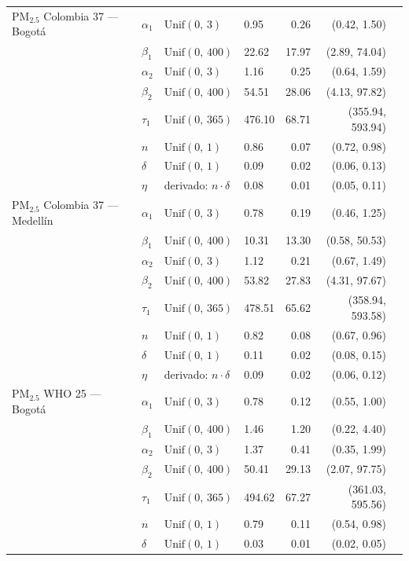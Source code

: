 \begin{longtable}{llllrrr}
PM$_{2.5}$ Colombia 37 --- Bogot\'{a} & $\alpha_{1}$ & $\text{Unif}(0,\,3)$ & 0.95 & 0.26 & (0.42, 1.50) \\
 & $\beta_{1}$ & $\text{Unif}(0,\,400)$ & 22.62 & 17.97 & (2.89, 74.04) \\
 & $\alpha_{2}$ & $\text{Unif}(0,\,3)$ & 1.16 & 0.25 & (0.64, 1.59) \\
 & $\beta_{2}$ & $\text{Unif}(0,\,400)$ & 54.51 & 28.06 & (4.13, 97.82) \\
 & $\tau_{1}$ & $\text{Unif}(0,\,365)$ & 476.10 & 68.71 & (355.94, 593.94) \\
 & $n$ & $\text{Unif}(0,\,1)$ & 0.86 & 0.07 & (0.72, 0.98) \\
 & $\delta$ & $\text{Unif}(0,\,1)$ & 0.09 & 0.02 & (0.06, 0.13) \\
 & $\eta$ & derivado: $n \cdot \delta$ & 0.08 & 0.01 & (0.05, 0.11) \\
\midrule
PM$_{2.5}$ Colombia 37 --- Medell\'{i}n & $\alpha_{1}$ & $\text{Unif}(0,\,3)$ & 0.78 & 0.19 & (0.46, 1.25) \\
 & $\beta_{1}$ & $\text{Unif}(0,\,400)$ & 10.31 & 13.30 & (0.58, 50.53) \\
 & $\alpha_{2}$ & $\text{Unif}(0,\,3)$ & 1.12 & 0.21 & (0.67, 1.49) \\
 & $\beta_{2}$ & $\text{Unif}(0,\,400)$ & 53.82 & 27.83 & (4.31, 97.67) \\
 & $\tau_{1}$ & $\text{Unif}(0,\,365)$ & 478.51 & 65.62 & (358.94, 593.58) \\
 & $n$ & $\text{Unif}(0,\,1)$ & 0.82 & 0.08 & (0.67, 0.96) \\
 & $\delta$ & $\text{Unif}(0,\,1)$ & 0.11 & 0.02 & (0.08, 0.15) \\
 & $\eta$ & derivado: $n \cdot \delta$ & 0.09 & 0.02 & (0.06, 0.12) \\
\midrule
PM$_{2.5}$ WHO 25 --- Bogot\'{a} & $\alpha_{1}$ & $\text{Unif}(0,\,3)$ & 0.78 & 0.12 & (0.55, 1.00) \\
 & $\beta_{1}$ & $\text{Unif}(0,\,400)$ & 1.46 & 1.20 & (0.22, 4.40) \\
 & $\alpha_{2}$ & $\text{Unif}(0,\,3)$ & 1.37 & 0.41 & (0.35, 1.99) \\
 & $\beta_{2}$ & $\text{Unif}(0,\,400)$ & 50.41 & 29.13 & (2.07, 97.75) \\
 & $\tau_{1}$ & $\text{Unif}(0,\,365)$ & 494.62 & 67.27 & (361.03, 595.56) \\
 & $n$ & $\text{Unif}(0,\,1)$ & 0.79 & 0.11 & (0.54, 0.98) \\
 & $\delta$ & $\text{Unif}(0,\,1)$ & 0.03 & 0.01 & (0.02, 0.05) \\

\end{longtable}
